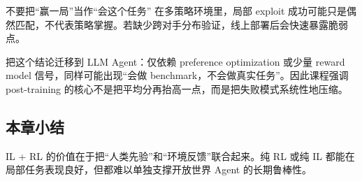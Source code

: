 \begin{warningbox}{不要把``赢一局''当作``会这个任务''}
在多策略环境里，局部 exploit 成功可能只是偶然匹配，不代表策略掌握。若缺少跨对手分布验证，线上部署后会快速暴露脆弱点。
\end{warningbox}

把这个结论迁移到 LLM Agent：仅依赖 preference optimization 或少量 reward model 信号，同样可能出现``会做 benchmark，不会做真实任务''。因此课程强调 post-training 的核心不是把平均分再抬高一点，而是把失败模式系统性地压缩。

\subsection{本章小结}
IL + RL 的价值在于把``人类先验''和``环境反馈''联合起来。纯 RL 或纯 IL 都能在局部任务表现良好，但都难以单独支撑开放世界 Agent 的长期鲁棒性。

